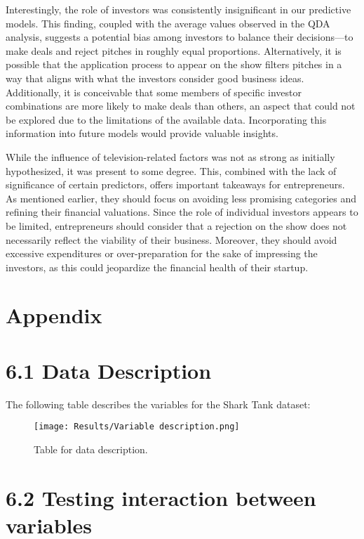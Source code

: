 \documentclass{article}
\begin{document}
Interestingly, the role of investors was consistently insignificant in our predictive models. This finding, coupled with the average values observed in the QDA analysis, suggests a potential bias among investors to balance their decisions—to make deals and reject pitches in roughly equal proportions. Alternatively, it is possible that the application process to appear on the show filters pitches in a way that aligns with what the investors consider good business ideas. Additionally, it is conceivable that some members of specific investor combinations are more likely to make deals than others, an aspect that could not be explored due to the limitations of the available data. Incorporating this information into future models would provide valuable insights.

While the influence of television-related factors was not as strong as initially hypothesized, it was present to some degree. This, combined with the lack of significance of certain predictors, offers important takeaways for entrepreneurs. As mentioned earlier, they should focus on avoiding less promising categories and refining their financial valuations. Since the role of individual investors appears to be limited, entrepreneurs should consider that a rejection on the show does not necessarily reflect the viability of their business. Moreover, they should avoid excessive expenditures or over-preparation for the sake of impressing the investors, as this could jeopardize the financial health of their startup.

\newpage
\section{Appendix}

\section*{6.1 Data Description}
The following table describes the variables for the Shark Tank dataset:

\begin{figure}[H]
    \centering
    \texttt{[image: Results/Variable description.png]} %
    \caption{Table for data description.}
    \label{fig:table_description}
\end{figure}

\section*{6.2 Testing interaction between variables}
\end{document}
